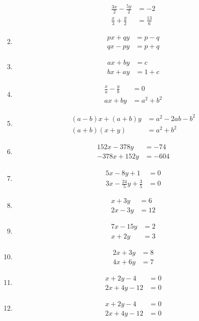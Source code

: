 \begin{multicols}{2}
\begin{enumerate}[label=\thesubsection.\arabic*,ref=\thesubsection.\theenumi]
	\begin{align*}
    	\frac{3x}{2}-\frac{5y}{2}&=-2\\ \frac{x}{3}+\frac{y}{2}&=\frac{13}{6}
    	\end{align*}
\item
\begin{align*}
px+qy&=p-q\\ qx-py&=p+q
\end{align*}
\item
\begin{align*}                                                   
ax+by&=c\\ bx+ay&=1+c
\end{align*}
\item 
\begin{align*}
\frac {x}{a}-\frac{y}{b}&=0\\ ax+by&=a^2+b^2
\end{align*}
\item
\begin{align*}
(a-b)x+(a+b)y&=a^2-2ab-b^2\\ (a+b)(x+y)&=a^2+b^2
\end{align*}
\item
\begin{align*}
152x-378y&=-74\\ -378x+152y&=-604
\end{align*}
\item
	\begin{align*}
5x-8y+1 &= 0 \\ 3x-\frac{24}{5}y+\frac{3}{5} &= 0
\end{align*}
\item 
	\begin{align*}
x+3y &= 6 \\  2x-3y &= 12
\end{align*}
\item 
	\begin{align*}
7x-15y &= 2 \\  x+2y &= 3
\end{align*}
\item 
\begin{align*}
2x+3y &= 8 \\ 4x+6y &= 7
\end{align*}
\item \begin{align*}x+2y-4&=0\\2x+4y-12&=0\end{align*}
\item \begin{align*}x+2y-4&=0\\2x+4y-12&=0\end{align*}

\end{enumerate}
\end{multicols}
